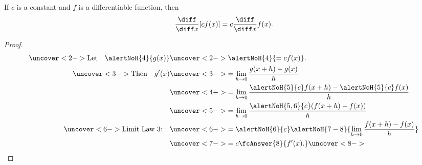 \begin{frame}
\begin{theorem}
If $c$ is a constant and $f$ is a differentiable function, then
\abovedisplayskip=0pt
\belowdisplayskip=0pt
\[
\frac{\diff}{\diff x} [cf(x)] = c\frac{\diff}{\diff x}f(x).
\]
\end{theorem}
\begin{proof}
\abovedisplayskip=0pt
\belowdisplayskip=-15pt
\abovedisplayshortskip=0pt
\belowdisplayshortskip=0pt
\begin{align*}
\uncover<2->{%
\text{Let}\quad \alertNoH{ 4}{g(x)} %
}%
 & \uncover<2->{%
 \alertNoH{ 4}{= cf(x)}.  %
}\\%
\uncover<3->{%
\text{Then}\quad g'(x)%
}%
 & \uncover<3->{%
 = \lim_{h\rightarrow 0}\frac{g(x+h)-g(x)}{h}%
}\\%
 & \uncover<4->{%
 = \lim_{h\rightarrow 0}\frac{\alertNoH{5}{c}f(x+h)-\alertNoH{5}{c}f(x)}{h}%
}\\%
 & \uncover<5->{%
 = \lim_{h\rightarrow 0}\frac{\alertNoH{5, 6}{c}(f(x+h)-f(x))}{h}%
}\\%
\uncover<6->{%
\text{Limit Law 3:}\quad %
}%
 & \uncover<6->{%
 = \alertNoH{ 6}{c}\alertNoH{ 7-8}{\lim_{h\rightarrow 0}\frac{f(x+h)-f(x)}{h}}%
}\\%
 & \uncover<7->{%
 = c\fcAnswer{8}{f'(x).}%
}%
\uncover<8->{\qedhere}
\end{align*}
\end{proof}
\end{frame}
